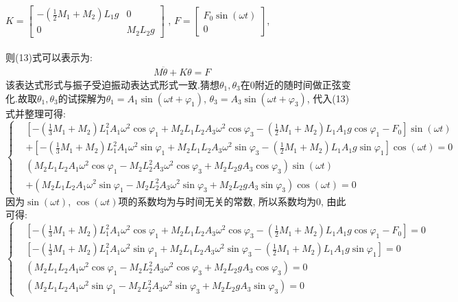 \documentclass[10.5pt,a4paper]{ctexart}
\begin{document}
$K = \begin{bmatrix} -\left(\frac{1}{2}M_1 + M_2\right)L_1g & 0 \\ 0 & M_2L_2g\end{bmatrix}$ , $F = \begin{bmatrix} F_0\sin{\left(\omega t\right)} \\ 0\end{bmatrix}$, \\\\则(13)式可以表示为:
\begin{equation}
  \begin{aligned}
  & M \ddot{\theta} + K \theta = F
  \end{aligned}
\end{equation}
该表达式形式与振子受迫振动表达式形式一致.猜想$\theta_1, \theta_3$在0附近的随时间做正弦变化.故取$\theta_1, \theta_3$的试探解为$\theta_1 = A_1\sin{\left(\omega t + \varphi_1\right)}$, $\theta_3 = A_3\sin{\left(\omega t + \varphi_3\right)}$\cite{ref6}, 代入(13)式并整理可得:
\begin{equation}
\left \{ 
  \begin{aligned}
  &\left[-\left(\frac{1}{3}M_1 + M_2\right)L_1^2A_1\omega^2 \cos{\varphi_1} + M_2L_1L_2A_3\omega^2\cos{\varphi_3} - \left(\frac{1}{2}M_1 + M_2\right)L_1A_1g\cos{\varphi_1} - F_0\right]\sin{\left(\omega t\right)}\\
  &+ \left[-\left(\frac{1}{3}M_1 + M_2\right)L_1^2A_1\omega^2 \sin{\varphi_1} + M_2L_1L_2A_3\omega^2\sin{\varphi_3} - \left(\frac{1}{2}M_1 + M_2\right)L_1A_1g\sin{\varphi_1} \right]\cos{\left(\omega t\right)} = 0\\
  &\left(M_2L_1L_2A_1\omega^2\cos{\varphi_1} - M_2L_2^2A_3\omega^2\cos{\varphi_3} + M_2L_2gA_3\cos{\varphi_3}\right)\sin{\left(\omega t\right)}\\
  &+ \left(M_2L_1L_2A_1\omega^2\sin{\varphi_1} - M_2L_2^2A_3\omega^2\sin{\varphi_3} + M_2L_2gA_3\sin{\varphi_3}\right)\cos{\left(\omega t\right)} = 0
  \end{aligned}
\right.
\end{equation}
因为$\sin{\left(\omega t\right)}$, $\cos{\left(\omega t\right)}$项的系数均为与时间无关的常数, 所以系数均为0, 由此可得:
\begin{equation}
\left \{ 
  \begin{aligned}
  & \left[-\left(\frac{1}{3}M_1 + M_2\right)L_1^2A_1\omega^2 \cos{\varphi_1} + M_2L_1L_2A_3\omega^2\cos{\varphi_3} - \left(\frac{1}{2}M_1 + M_2\right)L_1A_1g\cos{\varphi_1} - F_0\right] = 0 \\
  & \left[-\left(\frac{1}{3}M_1 + M_2\right)L_1^2A_1\omega^2 \sin{\varphi_1} + M_2L_1L_2A_3\omega^2\sin{\varphi_3} - \left(\frac{1}{2}M_1 + M_2\right)L_1A_1g\sin{\varphi_1} \right] = 0\\
  & \left(M_2L_1L_2A_1\omega^2\cos{\varphi_1} - M_2L_2^2A_3\omega^2\cos{\varphi_3} + M_2L_2gA_3\cos{\varphi_3}\right) = 0\\
  & \left(M_2L_1L_2A_1\omega^2\sin{\varphi_1} - M_2L_2^2A_3\omega^2\sin{\varphi_3} + M_2L_2gA_3\sin{\varphi_3}\right) = 0
  \end{aligned}
\right.
\end{equation}
\end{document}

